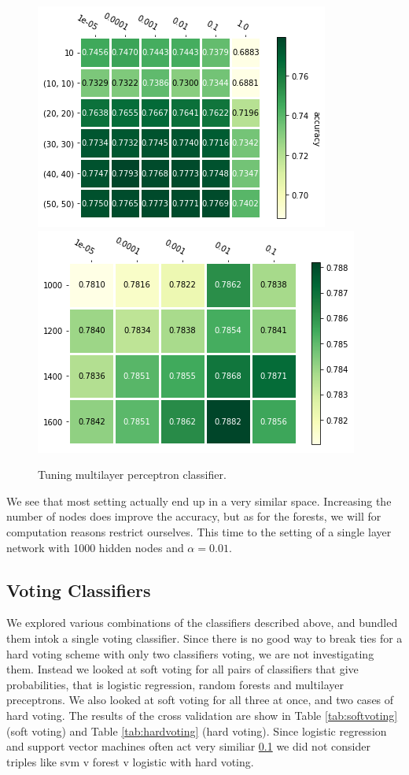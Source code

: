 \documentclass[parskip=half]{scrartcl}
\theoremstyle{definition}
\theoremstyle{remark}
\begin{document}
\begin{figure}[H]
\caption{Tuning multilayer perceptron classifier.}
\centering
\includegraphics[scale=0.6]{images/mlp_params1.png}
\includegraphics[scale=0.6]{images/mlp_params2.png}
\end{figure}

We see that most setting actually end up in a very similar space.
Increasing the number of nodes does improve the accuracy, but as for the forests, we will for computation reasons restrict ourselves.
This time to the setting of a single layer network with 1000 hidden nodes and $\alpha = 0.01$.

\subsection{Voting Classifiers}

We explored various combinations of the classifiers described above, and bundled them intok a single voting classifier. 
Since there is no good way to break ties for a hard voting scheme with only two classifiers voting, we are not investigating them. 
Instead we looked at soft voting for all pairs of classifiers that give probabilities, that is logistic regression, random forests and multilayer preceptrons. 
We also looked at soft voting for all three at once, and two cases of hard voting. 
The results of the cross validation are show in Table \ref{tab:softvoting} (soft voting) and Table \ref{tab:hardvoting} (hard voting). 
Since logistic regression and support vector machines often act very similiar \ref{} %
we did not consider triples like svm v forest v logistic with hard voting. 
\end{document}
